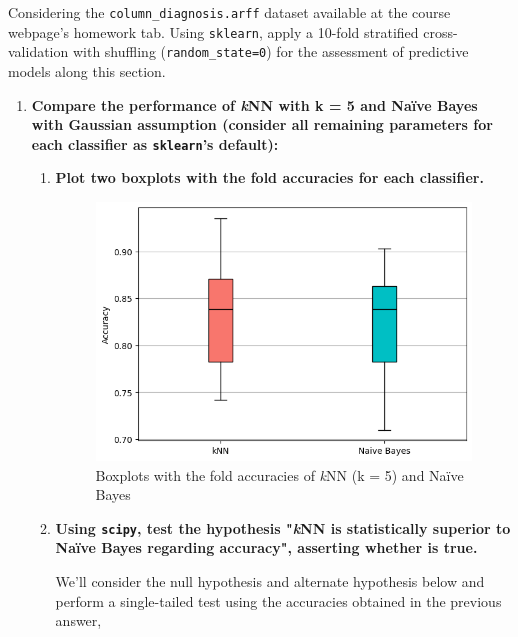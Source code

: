 \documentclass[12pt]{article}
\begin{document}
\noindent Considering the \texttt{column\_diagnosis.arff} dataset available at the course webpage’s homework tab. Using \texttt{sklearn}, apply a 10-fold stratified
cross-validation with shuffling (\texttt{random\_state=0}) for the assessment of predictive models along this section.

\begin{enumerate}[leftmargin=\labelsep]
    \item \textbf{Compare the performance of \textit{k}NN with k = 5 and Naïve Bayes with Gaussian assumption
          (consider all remaining parameters for each classifier as \texttt{sklearn}'s default):}
          \begin{enumerate}
          \item \textbf{Plot two boxplots with the fold accuracies for each classifier.}

          \vskip 0.3cm
          

          \begin{figure}[H]
            \centering
            \includegraphics[width=13cm]{./assets/boxplot_ex1_PartII.png}
            \caption{Boxplots with the fold accuracies of \textit{k}NN (k = 5) and Naïve Bayes}
            \label{fig:PartII-ex1a}
          \end{figure}

          \item \textbf{Using \texttt{scipy}, test the hypothesis "\textit{k}NN is statistically superior to Naïve Bayes regarding
                accuracy", asserting whether is true.}

          \vskip 0.3cm
          We'll consider the null hypothesis and alternate hypothesis below and perform a single-tailed test using the accuracies
          obtained in the previous answer,


\end{enumerate}
\end{enumerate}
\end{document}
